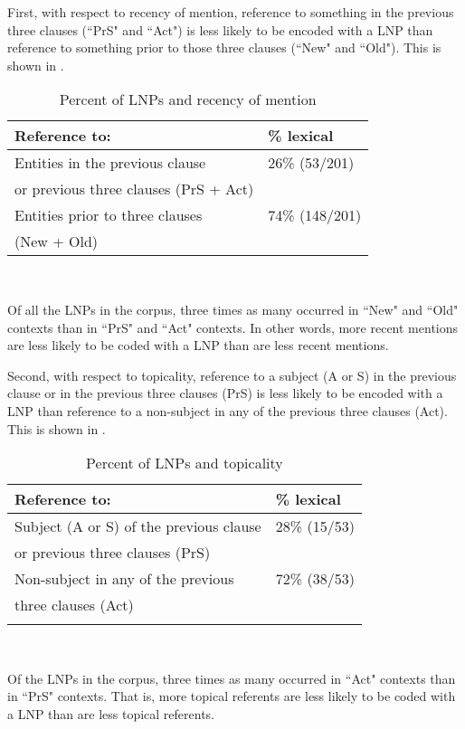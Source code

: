 First, with respect to recency of mention, reference to something in the previous three clauses (``PrS" and ``Act") is less likely to be encoded with a LNP than reference to something prior to those three clauses (``New" and ``Old"). This is shown in .
\begin{table} 

\caption{{Percent of LNPs and recency of mention}}
\begin{tabular}{| l | l |}
\midrule
 Reference to: & {\%} lexical \\

\midrule
Entities in the previous clause & 26{\%} (53/201) \\
or previous three clauses (PrS + Act)  & \\

\midrule
Entities prior to three clauses & 74{\%} (148/201) \\
(New + Old)  & \\

\midrule 
\end{tabular}\\
\label{recency}

\end{table}
Of all the LNPs in the corpus, three times as many occurred in ``New" and ``Old" contexts than in ``PrS" and ``Act" contexts. In other words, more recent mentions are less likely to be coded with a LNP than are less recent mentions.

Second, with respect to topicality, reference to a subject (A or S) in the previous clause or in the previous three clauses (PrS) is less likely to be encoded with a LNP than reference to a non-subject in any of the previous three clauses (Act). This is shown in .
\begin{table} 

\caption{{Percent of LNPs and topicality}}
\begin{tabular}{| l | l |}
\midrule
 Reference to: & {\%} lexical \\

\midrule
Subject (A or S) of the previous clause & 28{\%} (15/53)  \\
or previous three clauses (PrS)  & \\

\midrule
Non-subject in any of the previous & 72{\%} (38/53) \\
 three clauses (Act)  & \\

\lspbottomrule
\end{tabular}\\
\label{topicality}

\end{table}
Of the LNPs in the corpus, three times as many occurred in ``Act" contexts than in  ``PrS" contexts. That is, more topical referents are less likely to be coded with a LNP than are less topical referents. 

